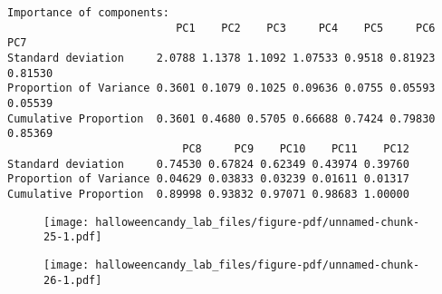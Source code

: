 \documentclass[
  letterpaper,
  DIV=11,
  numbers=noendperiod]{scrartcl}
\newenvironment{Shaded}{\begin{snugshade}}{\end{snugshade}}
\newcommand{\AttributeTok}[1]{\textcolor[rgb]{0.40,0.45,0.13}{#1}}
\newcommand{\CommentTok}[1]{\textcolor[rgb]{0.37,0.37,0.37}{#1}}
\newcommand{\DecValTok}[1]{\textcolor[rgb]{0.68,0.00,0.00}{#1}}
\newcommand{\FunctionTok}[1]{\textcolor[rgb]{0.28,0.35,0.67}{#1}}
\newcommand{\NormalTok}[1]{\textcolor[rgb]{0.00,0.23,0.31}{#1}}
\newcommand{\OtherTok}[1]{\textcolor[rgb]{0.00,0.23,0.31}{#1}}
\newcommand{\SpecialCharTok}[1]{\textcolor[rgb]{0.37,0.37,0.37}{#1}}
\begin{document}
\begin{verbatim}
Importance of components:
                          PC1    PC2    PC3     PC4    PC5     PC6     PC7
Standard deviation     2.0788 1.1378 1.1092 1.07533 0.9518 0.81923 0.81530
Proportion of Variance 0.3601 0.1079 0.1025 0.09636 0.0755 0.05593 0.05539
Cumulative Proportion  0.3601 0.4680 0.5705 0.66688 0.7424 0.79830 0.85369
                           PC8     PC9    PC10    PC11    PC12
Standard deviation     0.74530 0.67824 0.62349 0.43974 0.39760
Proportion of Variance 0.04629 0.03833 0.03239 0.01611 0.01317
Cumulative Proportion  0.89998 0.93832 0.97071 0.98683 1.00000
\end{verbatim}

\begin{Shaded}
\end{Shaded}

\begin{figure}[H]

{\centering \texttt{[image: halloweencandy\_lab\_files/figure-pdf/unnamed-chunk-25-1.pdf]}

}

\end{figure}

\begin{Shaded}
\end{Shaded}

\begin{figure}[H]

{\centering \texttt{[image: halloweencandy\_lab\_files/figure-pdf/unnamed-chunk-26-1.pdf]}

}

\end{figure}

\begin{Shaded}
\end{Shaded}
\end{document}
